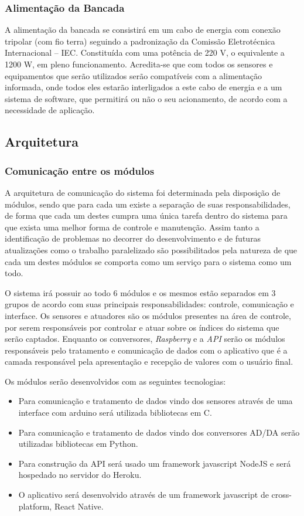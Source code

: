 \subsubsection{Alimentação da Bancada}

A alimentação da bancada se consistirá em um cabo de energia com conexão tripolar (com fio terra) seguindo a padronização da Comissão Eletrotécnica Internacional – IEC. Constituída com uma potência de 220 V, o equivalente a 1200 W, em pleno funcionamento. Acredita-se que com todos os sensores e equipamentos que serão utilizados serão compatíveis com a alimentação informada, onde todos eles estarão interligados a este cabo de energia e a um sistema de software, que permitirá ou não o seu acionamento, de acordo com a necessidade de aplicação.

\subsection{Arquitetura}

\subsubsection{Comunicação entre os módulos}

A arquitetura de comunicação do sistema foi determinada pela disposição de módulos, sendo que para cada um existe a separação de suas responsabilidades, de forma que cada um destes cumpra uma única tarefa dentro do sistema para que exista uma melhor forma de controle e manutenção. Assim tanto a identificação de problemas no decorrer do desenvolvimento e de futuras atualizações como o trabalho paralelizado são possibilitados pela natureza de que cada um destes módulos se comporta como um serviço para o sistema como um todo.

O sistema irá possuir ao todo 6 módulos e os mesmos estão separados em 3 grupos de acordo com suas principais responsabilidades: controle, comunicação e interface. Os sensores e atuadores são os módulos presentes na área de controle, por serem responsáveis por controlar e atuar sobre os índices do sistema que serão captados. Enquanto os conversores, \textit{Raspberry} e a \textit{API} serão os módulos responsáveis pelo tratamento e comunicação de dados com o aplicativo que é a camada responsável pela apresentação e recepção de valores com o usuário final.

Os módulos serão desenvolvidos com as seguintes tecnologias:
\begin{itemize}
  \item Para comunicação e tratamento de dados vindo dos sensores através de uma interface com arduino será utilizada bibliotecas em C.
  \item Para comunicação e tratamento de dados vindo dos conversores AD/DA serão utilizadas bibliotecas em Python.
  \item Para construção da API será usado um framework javascript NodeJS e será hospedado no servidor do Heroku.
  \item O aplicativo será desenvolvido através de um framework javascript de cross-platform, React Native.
\end{itemize}

